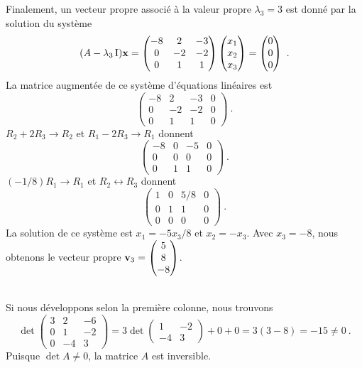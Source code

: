 {Finalement, un vecteur propre
associé à la valeur propre $\lambda_3 = 3$ est donné par la solution
du système
\[
(A-\lambda_3\operatorname{I})\mathbf{x} = 
\begin{pmatrix}
-8 & 2 & -3 \\ 0 & -2 & -2 \\ 0 & 1 & 1
\end{pmatrix}
\begin{pmatrix} x_1 \\ x_2 \\ x_3 \end{pmatrix}
= \begin{pmatrix} 0 \\ 0 \\ 0 \end{pmatrix} \ .
\]
La matrice augmentée de ce système d'équations linéaires est
\[
\left(\begin{array}{ccc|c}
-8 & 2 & -3 & 0 \\ 0 & -2 & -2 & 0 \\ 0 & 1 & 1 & 0
\end{array}\right) \ .
\]
$R_2+2R_3 \rightarrow R_2$ et $R_1-2R_3 \rightarrow R_1$ donnent
\[
\left(\begin{array}{ccc|c}
-8 & 0 & -5 & 0 \\ 0 & 0 & 0 & 0 \\ 0 & 1 & 1 & 0
\end{array}\right) \ .
\]
$(-1/8)R_1 \rightarrow R_1$ et $R_2\leftrightarrow R_3$ donnent
\[
\left(\begin{array}{ccc|c}
1 & 0 & 5/8 & 0 \\ 0 & 1 & 1 & 0 \\ 0 & 0 & 0 & 0
\end{array}\right) \ .
\]
La solution de ce système est $x_1=-5x_3/8$ et $x_2=-x_3$.  Avec $x_3=-8$,
nous obtenons le vecteur propre
$\displaystyle \mathbf{v}_3 = \begin{pmatrix} 5 \\ 8 \\ -8 \end{pmatrix}$.

\\
 Si nous développons selon la première colonne, nous trouvons
\[
\det \begin{pmatrix} 3 & 2 & -6 \\ 0 & 1 & -2 \\ 0 & -4 & 3
\end{pmatrix} 
= 3 \det\begin{pmatrix} 1 & -2 \\ -4 & 3 \end{pmatrix} + 0 + 0
= 3 (3 -8 ) = -15 \neq 0 \ .
\]
Puisque $\det A \neq 0$, la matrice $A$ est inversible.

}

